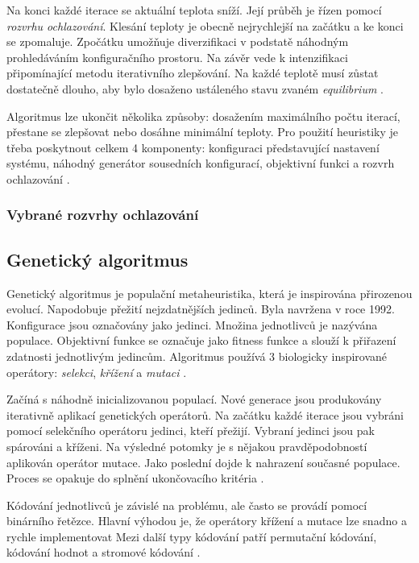Na konci každé iterace se aktuální teplota sníží.
Její průběh je řízen pomocí \textit{rozvrhu ochlazování}.
Klesání teploty je obecně nejrychlejší na začátku a ke konci se zpomaluje.
Zpočátku umožňuje diverzifikaci v podstatě náhodným prohledáváním konfiguračního prostoru.
Na závěr vede k intenzifikaci připomínající metodu iterativního zlepšování.
Na každé teplotě musí zůstat dostatečně dlouho, aby bylo dosaženo ustáleného stavu zvaném \textit{equilibrium} \cite{rutenbar, kirkpatrik}.

Algoritmus lze ukončit několika způsoby: dosažením maximálního počtu iterací, přestane se zlepšovat nebo dosáhne minimální teploty.
Pro použití heuristiky je třeba poskytnout celkem 4 komponenty: konfiguraci představující nastavení systému, náhodný generátor sousedních konfigurací, objektivní funkci a rozvrh ochlazování \cite{kirkpatrik}.

\subsubsection{Vybrané rozvrhy ochlazování}

\subsection{Genetický algoritmus}
Genetický algoritmus je populační metaheuristika, která je inspirována přirozenou evolucí.
Napodobuje přežití nejzdatnějších jedinců.
Byla navržena v roce 1992.
Konfigurace jsou označovány jako jedinci.
Množina jednotlivců je nazývána populace.
Objektivní funkce se označuje jako fitness funkce a slouží k přiřazení zdatnosti jednotlivým jedincům.
Algoritmus používá 3 biologicky inspirované operátory: \textit{selekci}, \textit{křížení} a \textit{mutaci} \cite{katoch}.

Začíná s náhodně inicializovanou populací.
Nové generace jsou produkovány iterativně aplikací genetických operátorů.
Na začátku každé iterace jsou vybráni pomocí selekčního operátoru jedinci, kteří přežijí.
Vybraní jedinci jsou pak spárováni a kříženi.
Na výsledné potomky je s nějakou pravděpodobností aplikován operátor mutace.
Jako poslední dojde k nahrazení současné populace.
Proces se opakuje do splnění ukončovacího kritéria \cite{katoch}.

Kódování jednotlivců je závislé na problému, ale často se provádí pomocí binárního řetězce.
Hlavní výhodou je, že operátory křížení a mutace lze snadno a rychle implementovat 
Mezi další typy kódování patří permutační kódování, kódování hodnot a stromové kódování \cite{katoch}.

